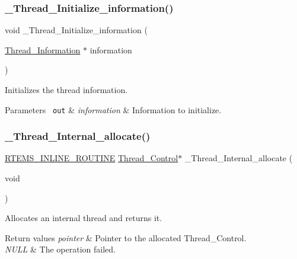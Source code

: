 \subsubsection{\texorpdfstring{\_Thread\_Initialize\_information()}{\_Thread\_Initialize\_information()}}
{\footnotesize\ttfamily void \+\_\+\+Thread\+\_\+\+Initialize\+\_\+information (\begin{DoxyParamCaption}\item[{\mbox{\hyperlink{structThread__Information}{Thread\+\_\+\+Information}} $\ast$}]{information }\end{DoxyParamCaption})}



Initializes the thread information. 


\begin{DoxyParams}[1]{Parameters}
\mbox{\texttt{ out}}  & {\em information} & Information to initialize. \\
\hline
\end{DoxyParams}
\mbox{\label{group__RTEMSScoreThread_ga176ea118dfa11ed7460dd0b072f1c8a8}} 
\subsubsection{\texorpdfstring{\_Thread\_Internal\_allocate()}{\_Thread\_Internal\_allocate()}}
{\footnotesize\ttfamily \mbox{\hyperlink{group__RTEMSScoreBaseDefs_gac216239df231d5dbd15e3520b0b9313f}{R\+T\+E\+M\+S\+\_\+\+I\+N\+L\+I\+N\+E\+\_\+\+R\+O\+U\+T\+I\+NE}} \mbox{\hyperlink{struct__Thread__Control}{Thread\+\_\+\+Control}}$\ast$ \+\_\+\+Thread\+\_\+\+Internal\+\_\+allocate (\begin{DoxyParamCaption}\item[{void}]{ }\end{DoxyParamCaption})}



Allocates an internal thread and returns it. 


\begin{DoxyRetVals}{Return values}
{\em pointer} & Pointer to the allocated Thread\+\_\+\+Control. \\
\hline
{\em N\+U\+LL} & The operation failed. \\
\hline
\end{DoxyRetVals}
\mbox{\label{group__RTEMSScoreThread_ga798bc92d66cc45b20ceb5b06049340d6}} 
